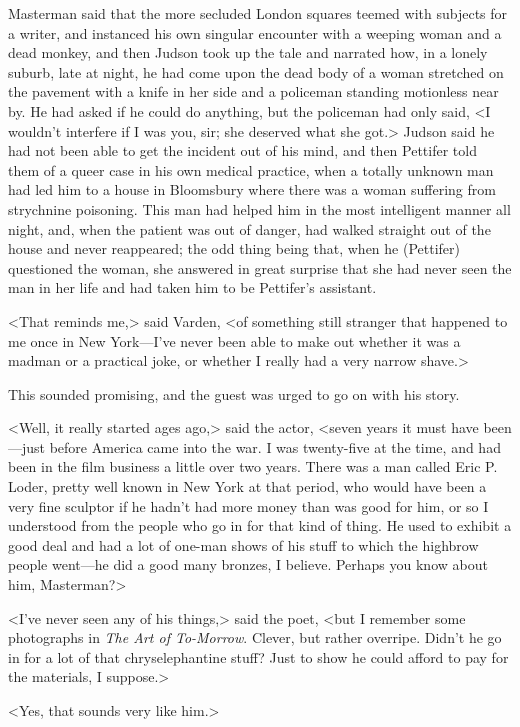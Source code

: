 Masterman said that the more secluded London squares teemed with subjects for a writer, and instanced his own singular encounter with a weeping woman and a dead monkey, and then Judson took up the tale and narrated how, in a lonely suburb, late at night, he had come upon the dead body of a woman stretched on the pavement with a knife in her side and a policeman standing motionless near by. He had asked if he could do anything, but the policeman had only said, <I wouldn't interfere if I was you, sir; she deserved what she got.> Judson said he had not been able to get the incident out of his mind, and then Pettifer told them of a queer case in his own medical practice, when a totally unknown man had led him to a house in Bloomsbury where there was a woman suffering from strychnine poisoning. This man had helped him in the most intelligent manner all night, and, when the patient was out of danger, had walked straight out of the house and never reappeared; the odd thing being that, when he (Pettifer) questioned the woman, she answered in great surprise that she had never seen the man in her life and had taken him to be Pettifer's assistant.

<That reminds me,> said Varden, <of something still stranger that happened to me once in New York—I've never been able to make out whether it was a madman or a practical joke, or whether I really had a very narrow shave.>

This sounded promising, and the guest was urged to go on with his story.

<Well, it really started ages ago,> said the actor, <seven years it must have been—just before America came into the war. I was twenty-five at the time, and had been in the film business a little over two years. There was a man called Eric P\@. Loder, pretty well known in New York at that period, who would have been a very fine sculptor if he hadn't had more money than was good for him, or so I understood from the people who go in for that kind of thing. He used to exhibit a good deal and had a lot of one-man shows of his stuff to which the highbrow people went—he did a good many bronzes, I believe. Perhaps you know about him, Masterman?>

<I've never seen any of his things,> said the poet, <but I remember some photographs in \textit{The Art of To-Morrow}. Clever, but rather overripe. Didn't he go in for a lot of that chryselephantine stuff? Just to show he could afford to pay for the materials, I suppose.>

<Yes, that sounds very like him.>

